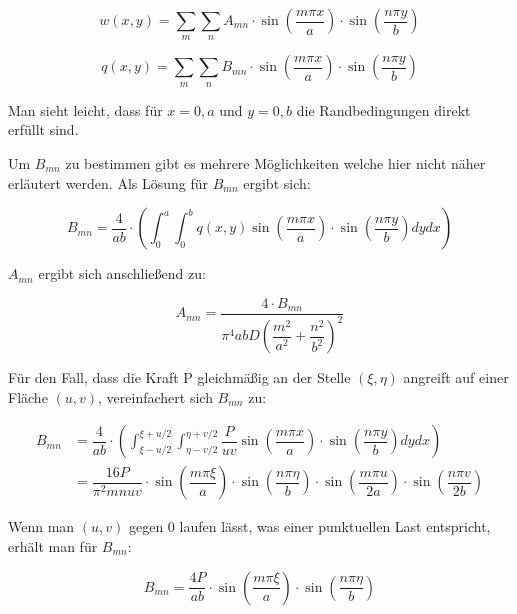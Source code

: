 \begin{equation} 
w(x,y) = \sum_m \sum_n A_{mn} \cdot \sin\left(\dfrac{m \pi x}{a}\right) \cdot \sin\left(\dfrac{n \pi y}{b}\right)
\end{equation} 

\begin{equation} 
q(x,y) = \sum_m \sum_n B_{mn} \cdot \sin\left(\dfrac{m \pi x}{a}\right) \cdot \sin\left(\dfrac{n \pi y}{b}\right)
\end{equation} 

Man sieht leicht, dass für $x=0,a$ und $y=0,b$ die Randbedingungen direkt erfüllt sind.

Um $B_{mn}$ zu bestimmen gibt es mehrere Möglichkeiten welche hier nicht näher erläutert werden. Als Lösung für $B_{mn}$ ergibt sich:


\begin{equation}
B_{mn} = \dfrac{4}{ab} \cdot \left( \int_0^a \int_0^b q(x,y) 
\sin\left(\dfrac{m \pi x}{a}\right) \cdot \sin\left( \dfrac{n \pi y}{b}\right) dy dx\right)
\end{equation}

$A_{mn}$ ergibt sich anschließend zu:

\begin{equation}
A_{mn} = \dfrac{4 \cdot B_{mn}}{\pi^4 a b D \left(\dfrac{m^2}{a^2} + \dfrac{n^2}{b^2} \right)^2}
\end{equation}

Für den Fall, dass die Kraft P gleichmäßig an der Stelle $(\xi, \eta)$ angreift auf einer Fläche $(u,v)$, vereinfachert sich $B_{mn}$ zu:



\begin{align}
B_{mn} &= \dfrac{4}{ab} \cdot \left( \int_{\xi-u/2}^{\xi+u/2} \int_{\eta - v/2}^{\eta + v/2} \dfrac{P}{u v}
\sin\left(\dfrac{m \pi x}{a}\right) \cdot \sin\left( \dfrac{n \pi y}{b} \right)dy dx\right) \\
&= \dfrac{16P}{\pi^2 m n u v} 
\cdot \sin\left(\dfrac{m \pi \xi}{a}\right) 
\cdot \sin\left(\dfrac{n \pi \eta}{b}\right) 
\cdot \sin\left(\dfrac{m \pi u}{2a}\right) 
\cdot \sin\left(\dfrac{n \pi v}{2b}\right)
\end{align}


Wenn man $(u,v)$ gegen $0$ laufen lässt, was einer punktuellen Last entspricht, erhält man für $B_{mn}$:

\begin{equation}
B_{mn} = \dfrac{4P}{a b} 
\cdot \sin\left(\dfrac{m \pi \xi}{a}\right) 
\cdot \sin\left(\dfrac{n \pi \eta}{b}\right) 
\end{equation}


